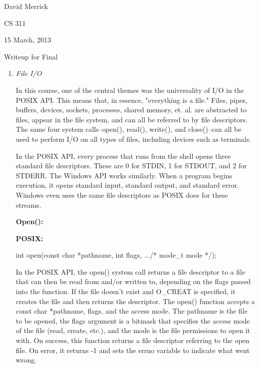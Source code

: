 \documentclass[letterpaper,10pt,titlepage]{article}
\newcommand{\ignore}[2]{\hspace{0in}#2} %
\newcommand{\tab}{\hspace*{2em}} %
\begin{document}
David Merrick

CS 311

15 March, 2013

\begin{center}
{\LARGE Writeup for Final}
\end{center}

\begin{enumerate} 
\item \emph{File I/O}

\tab In this course, one of the central themes was the universality of I/O in the POSIX API. This means that, in essence, "everything is a file." Files, pipes, buffers, devices, sockets, processes, shared memory, et. al. are abstracted to files, appear in the file system, and can all be referred to by file descriptors. The same four system calls--open(), read(), write(), and close()--can all be used to perform I/O on all types of files, including devices such as terminals. \newline

\tab In the POSIX API, every process that runs from the shell opens three standard file descriptors. These are 0 for STDIN, 1 for STDOUT, and 2 for STDERR. The Windows API works similarly. When a program begins execution, it opens standard input, standard output, and standard error. Windows even uses the same file descriptors as POSIX does for these streams. \newline

\textbf{Open():}

\textbf{POSIX:}

int open(const char *pathname, int flags, .../* mode\_t mode */);\newline

\tab In the POSIX API, the open() system call returns a file descriptor to a file that can then be read from and/or written to, depending on the flags passed into the function. If the file doesn't exist and O\_CREAT is specified, it creates the file and then returns the descriptor. The open() function accepts a const char *pathname, flags, and the access mode. The pathname is the file to be opened, the flags argument is a bitmask that specifies the access mode of the file (read, create, etc.), and the mode is the file permissions to open it with\ignore{\[TLPI, pg. 72\]}. On success, this function returns a file descriptor referring to the open file. On error, it returns -1 and sets the errno variable to indicate what went wrong. \newline %


\end{enumerate}
\end{document}
